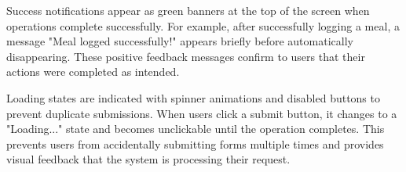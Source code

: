 Success notifications appear as green banners at the top of the screen when operations complete successfully. For example, after successfully logging a meal, a message "Meal logged successfully!" appears briefly before automatically disappearing. These positive feedback messages confirm to users that their actions were completed as intended.

Loading states are indicated with spinner animations and disabled buttons to prevent duplicate submissions. When users click a submit button, it changes to a "Loading..." state and becomes unclickable until the operation completes. This prevents users from accidentally submitting forms multiple times and provides visual feedback that the system is processing their request.
